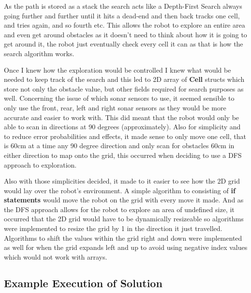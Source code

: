 \documentclass[a4paper,12pt]{article}
\begin{document}
\vspace{5mm}
\noindent As the path is stored as a stack the search acts like a Depth-First Search always going further and further until it hits a dead-end and then back tracks one cell, and tries again, and so fourth etc. This allows the robot to explore an entire area and even get around obstacles as it doesn't need to think about how it is going to get around it, the robot just eventually check every cell it can as that is how the search algorithm works.

\vspace{5mm}
\noindent Once I knew how the exploration would be controlled I knew what would be needed to keep track of the search and this led to 2D array of \textbf{Cell} structs which store not only the obstacle value, but other fields required for search purposes as well. Concerning the issue of which sonar sensors to use, it seemed sensible to only use the front, rear, left and right sonar sensors as they would be more accurate and easier to work with. This did meant that the robot would only be able to scan in directions at 90 degrees (approximately). Also for simplicity and to reduce error probabilities and effects, it made sense to only move one cell, that is 60cm at a time any 90 degree direction and only scan for obstacles 60cm in either direction to map onto the grid, this occurred when deciding to use a DFS approach to exploration.

\vspace{5mm}
\noindent Also with those simplicities decided, it made to it easier to see how the 2D grid would lay over the robot's environment. A simple algorithm to consisting of \textbf{if statements} would move the robot on the grid with every move it made. And as the DFS approach allows for the robot to explore an area of undefined size, it occurred that the 2D grid would have to be dynamically resizeable so algorithms were implemented to resize the grid by 1 in the direction it just travelled. Algorithms to shift the values within the grid right and down were implemented as well for when the grid expands left and up to avoid using negative index values which would not work with arrays.

\subsection{Example Execution of Solution}
\end{document}
